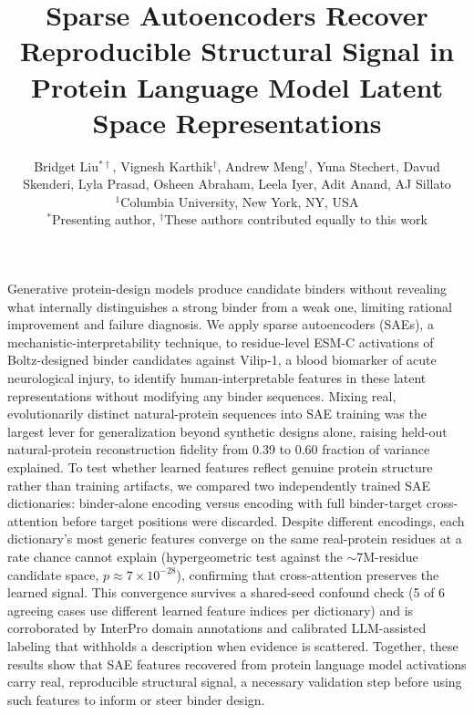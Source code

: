 \documentclass[11pt]{article}
\date{}
\title{Sparse Autoencoders Recover Reproducible Structural Signal in Protein Language Model Latent Space Representations}
\author{
    Bridget Liu$^{\ast\dagger}$,
    Vignesh Karthik$^{\dagger}$,
    Andrew Meng$^{\dagger}$,
    Yuna Stechert,
    Davud Skenderi,
    Lyla Prasad,
    Osheen Abraham,
    Leela Iyer,
    Adit Anand,
    AJ Sillato \\[6pt]
    {\small $^{1}$Columbia University, New York, NY, USA} \\
    {\small $^{\ast}$Presenting author, $^{\dagger}$These authors contributed equally to this work}
}
\begin{document}
\maketitle

Generative protein-design models produce candidate binders without revealing what internally distinguishes a strong binder from a weak one, limiting rational improvement and failure diagnosis. We apply sparse autoencoders (SAEs), a mechanistic-interpretability technique, to residue-level ESM-C activations of Boltz-designed binder candidates against Vilip-1, a blood biomarker of acute neurological injury, to identify human-interpretable features in these latent representations without modifying any binder sequences. Mixing real, evolutionarily distinct natural-protein sequences into SAE training was the largest lever for generalization beyond synthetic designs alone, raising held-out natural-protein reconstruction fidelity from 0.39 to 0.60 fraction of variance explained. To test whether learned features reflect genuine protein structure rather than training artifacts, we compared two independently trained SAE dictionaries: binder-alone encoding versus encoding with full binder-target cross-attention before target positions were discarded. Despite different encodings, each dictionary's most generic features converge on the same real-protein residues at a rate chance cannot explain (hypergeometric test against the $\sim$7M-residue candidate space, $p \approx 7\times10^{-28}$), confirming that cross-attention preserves the learned signal. This convergence survives a shared-seed confound check (5 of 6 agreeing cases use different learned feature indices per dictionary) and is corroborated by InterPro domain annotations and calibrated LLM-assisted labeling that withholds a description when evidence is scattered. Together, these results show that SAE features recovered from protein language model activations carry real, reproducible structural signal, a necessary validation step before using such features to inform or steer binder design.


\end{document}
